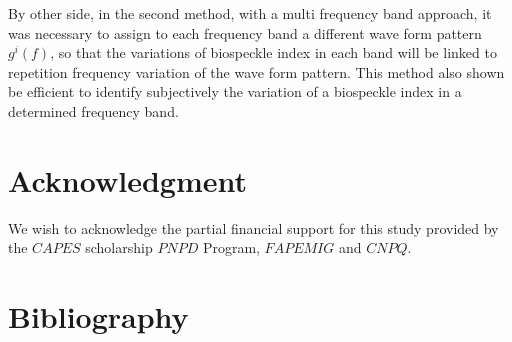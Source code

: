 \documentclass[review]{elsarticle}
\begin{document}
By other side, in the second method, with a multi frequency band approach,
it was necessary to assign to each frequency band a different wave form pattern $g^i(f)$,
so that the variations of biospeckle index in each band will be linked to repetition frequency variation
of the  wave form pattern. This method also shown be efficient to identify  subjectively
the variation of a biospeckle index in a determined frequency band.

\section{Acknowledgment}
We wish to acknowledge the partial financial support for this study provided by the $CAPES$ 
scholarship
$PNPD$ Program, $FAPEMIG$ and $CNPQ$.

\section{Bibliography}


\end{document}
